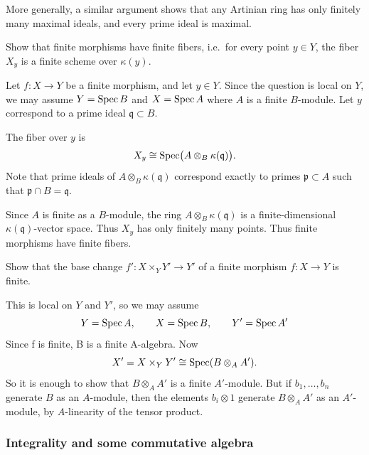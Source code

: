 \documentclass[12pt]{article}
\begin{document}
More generally, a similar argument shows that any Artinian ring has only finitely many maximal ideals, and every prime ideal is maximal.



\begin{exercise}
    Show that finite morphisms have finite fibers, i.e.\ for every point $y\in Y$, the fiber $X_y$ is a finite scheme over $\kappa(y)$.
\end{exercise}

\begin{solution}
    Let $f:X\to Y$ be a finite morphism, and let $y\in Y$. Since the question is local on $Y$, we may assume $Y=\operatorname{Spec} B$ and $X=\operatorname{Spec} A$ where $A$ is a finite $B$-module. Let $y$ correspond to a prime ideal $\mathfrak q\subset B$.

    The fiber over $y$ is
    \[
        X_y \cong \operatorname{Spec}\bigl(A\otimes_B \kappa(\mathfrak q)\bigr).
    \]
    Note that prime ideals of $A \otimes_B \kappa(\mathfrak q)$ correspond exactly to primes $\mathfrak p \subset A$ such that $\mathfrak p \cap B = \mathfrak q$.

    Since $A$ is finite as a $B$-module, the ring $A\otimes_B \kappa(\mathfrak q)$ is a finite-dimensional $\kappa(\mathfrak q)$-vector space. Thus $X_y$ has only finitely many points. Thus finite morphisms have finite fibers.
\end{solution}

\begin{exercise}
    Show that the base change $f':X\times_Y Y' \to Y'$ of a finite morphism $f:X\to Y$ is finite.
\end{exercise}

\begin{solution}
    This is local on $Y$ and $Y'$, so we may assume \[Y=\operatorname{Spec} A,\qquad X=\operatorname{Spec} B,\qquad Y'=\operatorname{Spec} A'\]
    Since f is finite, B is a finite A-algebra. Now
    \[
        X' = X\times_Y Y' \cong \operatorname{Spec}(B\otimes_A A').
    \]
    So it is enough to show that $B\otimes_A A'$ is a finite $A'$-module. But if $b_1,\dots,b_n$ generate $B$ as an $A$-module, then the elements $b_i \otimes 1$ generate $B\otimes_A A'$ as an $A'$-module, by $A$-linearity of the tensor product.
\end{solution}

\subsubsection{Integrality and some commutative algebra}
\end{document}
